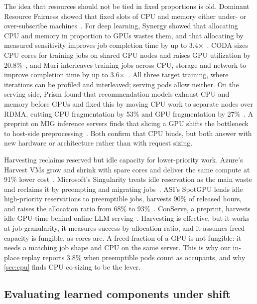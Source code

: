 \documentclass[10pt]{article}
\begin{document}
The idea that resources should not be tied in fixed proportions is old. Dominant Resource Fairness showed that fixed slots of CPU and memory either under- or over-subscribe machines~\citep{ghodsi2011drf}. For deep learning, Synergy showed that allocating CPU and memory in proportion to GPUs wastes them, and that allocating by measured sensitivity improves job completion time by up to 3.4$\times$~\citep{mohan2022synergy}. CODA sizes CPU cores for training jobs on shared GPU nodes and raises GPU utilization by 20.8\%~\citep{zhao2020coda}, and Muri interleaves training jobs across CPU, storage and network to improve completion time by up to 3.6$\times$~\citep{zhao2022muri}. All three target training, where iterations can be profiled and interleaved; serving pods allow neither. On the serving side, Prism found that recommendation models exhaust CPU and memory before GPUs and fixed this by moving CPU work to separate nodes over RDMA, cutting CPU fragmentation by 53\% and GPU fragmentation by 27\%~\citep{yang2025prism}. A preprint on MIG inference servers finds that slicing a GPU shifts the bottleneck to host-side preprocessing~\citep{yeo2024preba}. Both confirm that CPU binds, but both answer with new hardware or architecture rather than with request sizing.

Harvesting reclaims reserved but idle capacity for lower-priority work. Azure's Harvest VMs grow and shrink with spare cores and deliver the same compute at 91\% lower cost~\citep{ambati2020harvest}. Microsoft's Singularity treats idle reservation as the main waste and reclaims it by preempting and migrating jobs~\citep{shukla2022singularity}. ASI's SpotGPU lends idle high-priority reservations to preemptible jobs, harvests 90\% of released hours, and raises the allocation ratio from 68\% to 93\%~\citep{li2026asi}. ConServe, a preprint, harvests idle GPU time behind online LLM serving~\citep{qiao2025conserve}. Harvesting is effective, but it works at job granularity, it measures success by allocation ratio, and it assumes freed capacity is fungible, as cores are. A freed fraction of a GPU is not fungible: it needs a matching job shape and CPU on the same server. This is why our in-place replay reports 3.8\% when preemptible pods count as occupants, and why \cref{sec:cpu} finds CPU co-sizing to be the lever.

\subsection{Evaluating learned components under shift}
\label{sec:rw-eval}
\end{document}
